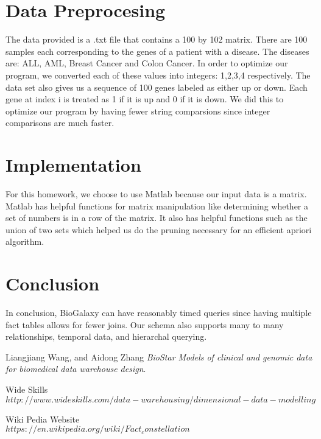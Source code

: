 \documentclass[12pt]{article}
\begin{document}
\section*{Data Preprocesing}
\noindent The data provided is a .txt file that contains a 100 by 102 matrix. There are 100 samples each corresponding to the genes of a patient with a disease. The diseases are: ALL, AML, Breast Cancer and Colon Cancer. In order to optimize our program, we converted each of these values into integers: 1,2,3,4 respectively. The data set also gives us a sequence of 100 genes labeled as either up or down. Each gene at index i is treated as 1 if it is up and 0 if it is down. We did this to optimize our program by having fewer string comparsions since integer comparisons are much faster. 

\section*{Implementation}
\noindent For this homework, we choose to use Matlab because our input data is a matrix. Matlab has helpful functions for matrix manipulation like determining whether a set of numbers is in a row of the matrix. It also has helpful functions such as the union of two sets which helped us do the pruning necessary for an efficient apriori algorithm.


\section*{Conclusion}

In conclusion, BioGalaxy can have reasonably timed queries since having multiple fact tables allows for fewer joins. Our schema also supports many to many relationships, temporal data, and hierarchal querying.






\begin{thebibliography}{9}
	Liangjiang Wang, and Aidong Zhang 
	\textit{BioStar Models of clinical and genomic data for biomedical data warehouse design}. 
	
	
	Wide Skills
	\\\texttt{$http://www.wideskills.com/data-warehousing/dimensional-data-modelling$}
	
	Wiki Pedia Website
	\\\texttt{$https://en.wikipedia.org/wiki/Fact_constellation$}
\end{thebibliography}
\end{document}
